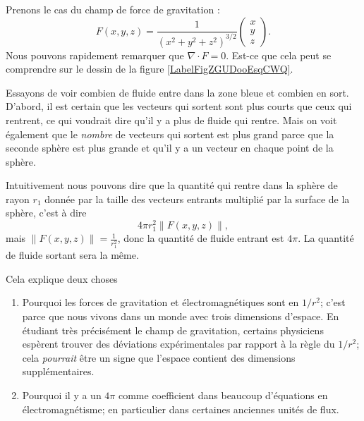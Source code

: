 \begin{example}
    Prenons le cas du champ de force de gravitation :
    \begin{equation}
        F(x,y,z)=\frac{1}{ (x^2+y^2+z^2)^{3/2} }\begin{pmatrix}
            x    \\ 
            y   \\
            z
        \end{pmatrix}.
    \end{equation}
    Nous pouvons rapidement remarquer que $\nabla\cdot F=0$. Est-ce que cela peut se comprendre sur le dessin de la figure \ref{LabelFigZGUDooEsqCWQ}. %
\newcommand{\CaptionFigZGUDooEsqCWQ}{Le champ de vecteur de la gravité. Nous avons tracé, sur les deux cercles la même densité de vecteurs, c'est à dire le même nombre de vecteurs par unité de surface.}


    Essayons de voir combien de fluide entre dans la zone bleue et combien en sort. D'abord, il est certain que les vecteurs qui sortent sont plus courts que ceux qui rentrent, ce qui voudrait dire qu'il y a plus de fluide qui rentre. Mais on voit également que le \emph{nombre} de vecteurs qui sortent est plus grand parce que la seconde sphère est plus grande et qu'il y a un vecteur en chaque point de la sphère.

    Intuitivement nous pouvons dire que la quantité qui rentre dans la sphère de rayon $r_1$ donnée par la taille des vecteurs entrants multiplié par la surface de la sphère, c'est à dire
    \begin{equation}        \label{EqQpinormeVecto}
        4\pi r_1^2\| F(x,y,z) \|,
    \end{equation}
    mais $\| F(x,y,z) \|=\frac{1}{ r_1^2 }$, donc la quantité de fluide entrant est $4\pi$. La quantité de fluide sortant sera la même.

    Cela explique deux choses
    \begin{enumerate}
        \item
            Pourquoi les forces de gravitation et électromagnétiques sont en $1/r^2$; c'est parce que nous vivons dans un monde avec trois dimensions d'espace. En étudiant très précisément le champ de gravitation, certains physiciens espèrent trouver des déviations expérimentales par rapport à la règle du \( 1/r^2\); cela \emph{pourrait} être un signe que l'espace contient des dimensions supplémentaires.
        \item
            Pourquoi il y a un $4\pi$ comme coefficient dans beaucoup d'équations en électromagnétisme; en particulier dans certaines anciennes unités de flux.
    \end{enumerate}
    
\end{example}

